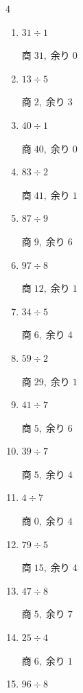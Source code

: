 \begin{multicols}{4}
\begin{enumerate}
        $商\; 13,\; 余り\; 0$

  \item $31 \div 1$

        $商\; 31,\; 余り\; 0$

  \item $13 \div 5$

        $商\; 2,\; 余り\; 3$

  \item $40 \div 1$

        $商\; 40,\; 余り\; 0$

  \item $83 \div 2$

        $商\; 41,\; 余り\; 1$

  \item $87 \div 9$

        $商\; 9,\; 余り\; 6$

  \item $97 \div 8$

        $商\; 12,\; 余り\; 1$

  \item $34 \div 5$

        $商\; 6,\; 余り\; 4$

  \item $59 \div 2$

        $商\; 29,\; 余り\; 1$

  \item $41 \div 7$

        $商\; 5,\; 余り\; 6$

  \item $39 \div 7$

        $商\; 5,\; 余り\; 4$

  \item $4 \div 7$

        $商\; 0,\; 余り\; 4$

  \item $79 \div 5$

        $商\; 15,\; 余り\; 4$

\columnbreak %

  \item $47 \div 8$

        $商\; 5,\; 余り\; 7$

  \item $25 \div 4$

        $商\; 6,\; 余り\; 1$

  \item $96 \div 8$


\end{enumerate}
\end{multicols}
